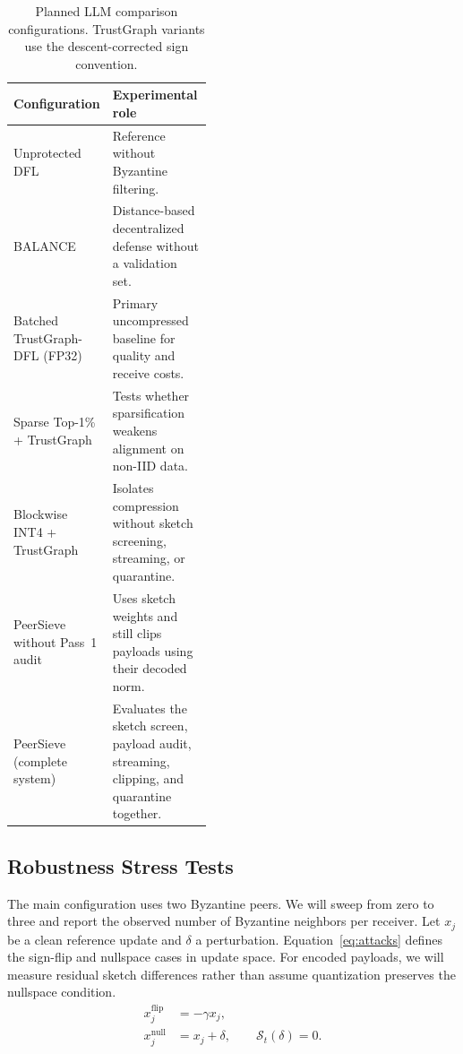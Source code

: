 \documentclass{article}
\begin{document}
\begin{table}[tbp]
  \caption{Planned LLM comparison configurations. TrustGraph variants use the descent-corrected sign convention.}
  \label{tab:baselines}
  \centering\small
  \begin{tabularx}{\linewidth}{@{}P{0.44\linewidth}Y@{}}
    \toprule
    Configuration & Experimental role \\
    \midrule
    Unprotected DFL & Reference without Byzantine filtering. \\
    BALANCE & Distance-based decentralized defense without a validation set. \\
    Batched TrustGraph-DFL (FP32) & Primary uncompressed baseline for quality and receive costs. \\
    Sparse Top-1\% + TrustGraph & Tests whether sparsification weakens alignment on non-IID data. \\
    Blockwise INT4 + TrustGraph & Isolates compression without sketch screening, streaming, or quarantine. \\
    PeerSieve without Pass~1 audit & Uses sketch weights and still clips payloads using their decoded norm. \\
    PeerSieve (complete system) & Evaluates the sketch screen, payload audit, streaming, clipping, and quarantine together. \\
    \bottomrule
  \end{tabularx}
\end{table}

\subsection{Robustness Stress Tests}

The main configuration uses two Byzantine peers. We will sweep from zero to three and report the observed number of Byzantine neighbors per receiver. Let $x_j$ be a clean reference update and $\delta$ a perturbation. Equation~\eqref{eq:attacks} defines the sign-flip and nullspace cases in update space. For encoded payloads, we will measure residual sketch differences rather than assume quantization preserves the nullspace condition.
\begin{equation}
\begin{aligned}
  x_j^{\mathrm{flip}} &= -\gamma x_j, \\
  x_j^{\mathrm{null}} &= x_j+\delta, \qquad \mathcal S_t(\delta)=0 .
\end{aligned}
\label{eq:attacks}
\end{equation}
\end{document}
